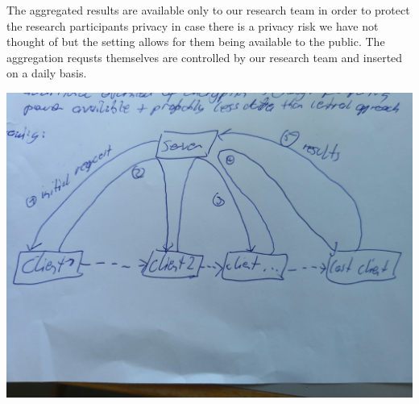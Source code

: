  The aggregated results are available only to our research team in order to protect the research participants privacy in case there is a privacy risk we have not thought of but the setting allows for them being available to the public. The aggregation requsts themselves are controlled by our research team and inserted on a daily basis.

\includegraphics[width=\textwidth]{data/concept.jpg}

